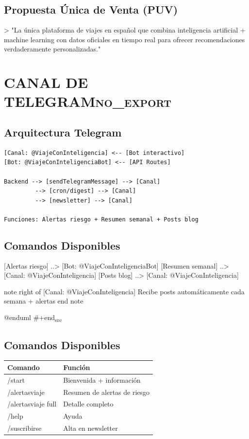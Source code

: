 \documentclass[11pt]{article}
\begin{document}
\subsection{Propuesta Única de Venta (PUV)}
\label{sec:org44f5b8a}

> "La única plataforma de viajes en español que combina inteligencia artificial + machine learning con datos oficiales en tiempo real para ofrecer recomendaciones verdaderamente personalizadas."

\section{CANAL DE TELEGRAM\hfill{}\textsc{no\_export}}
\label{sec:org3e74d2b}
\subsection{Arquitectura Telegram}
\label{sec:org96f6e3e}

\begin{verbatim}
[Canal: @ViajeConInteligencia] <-- [Bot interactivo]
[Bot: @ViajeConInteligenciaBot] <-- [API Routes]

Backend --> [sendTelegramMessage] --> [Canal]
         --> [cron/digest] --> [Canal]
         --> [newsletter] --> [Canal]

Funciones: Alertas riesgo + Resumen semanal + Posts blog
\end{verbatim}

\subsection{Comandos Disponibles}
\label{sec:orge6b172f}
[Alertas riesgo] ..> [Bot: @ViajeConInteligenciaBot]
[Resumen semanal] ..> [Canal: @ViajeConInteligencia]
[Posts blog] ..> [Canal: @ViajeConInteligencia]

note right of [Canal: @ViajeConInteligencia]
  Recibe posts automáticamente
  cada semana + alertas
end note

@enduml
\#+end\textsubscript{src}

\subsection{Comandos Disponibles}
\label{sec:org2e1522c}

\begin{center}
\begin{tabular}{ll}
Comando & Función\\
\hline
/start & Bienvenida + información\\
/alertasviaje & Resumen de alertas de riesgo\\
/alertasviaje full & Detalle completo\\
/help & Ayuda\\
/suscribirse & Alta en newsletter\\
\end{tabular}
\end{center}
\end{document}
